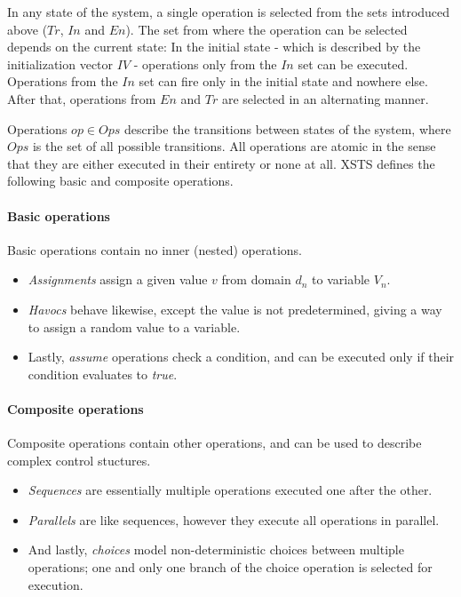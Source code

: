 In any state of the system, a single operation is selected from the sets introduced above (\(\mathit{Tr}\), \(\mathit{In}\) and \(\mathit{En}\)). The set from where the operation can be selected depends on the current state: In the initial state - which is described by the initialization vector \(\mathit{IV}\) - operations only from the \(\mathit{In}\) set can be executed. Operations from the \(\mathit{In}\) set can fire only in the initial state and nowhere else. After that, operations from \(\mathit{En}\) and \(\mathit{Tr}\) are selected in an alternating manner.

Operations \(\mathit{op} \in \mathit{Ops}\) describe the transitions between states of the system, where \(\mathit{Ops}\) is the set of all possible transitions. All operations are atomic in the sense that they are either executed in their entirety or none at all. XSTS defines the following basic and composite operations.

\paragraph{Basic operations} 

Basic operations contain no inner (nested) operations.

\begin{itemize}
	\item \emph{Assignments} assign a given value \(v\) from domain \(d_n\) to variable \(V_n\).
	\item \emph{Havocs} behave likewise, except the value is not predetermined, giving a way to assign a random value to a variable.
	\item Lastly, \emph{assume} operations check a condition, and can be executed only if their condition evaluates to \emph{true}.
\end{itemize}

\paragraph{Composite operations}

Composite operations contain other operations, and can be used to describe complex control stuctures. 

\begin{itemize}
	\item \emph{Sequences} are essentially multiple operations executed one after the other.
	\item \emph{Parallels} are like sequences, however they execute all operations in parallel.
	\item And lastly, \emph{choices} model non-deterministic choices between multiple operations; one and only one branch of the choice operation is selected for execution.
\end{itemize}

